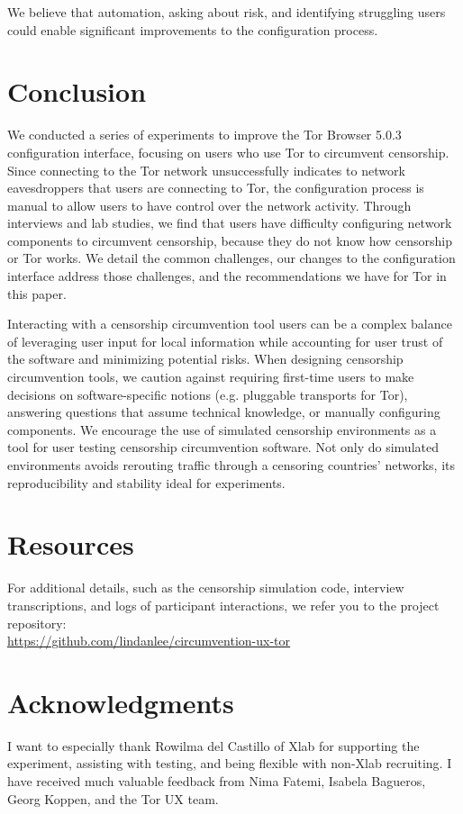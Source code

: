 \documentclass[USenglish,oneside,twocolumn]{article}
\begin{document}
We believe that automation, asking about risk, and identifying struggling users could enable significant improvements to the configuration process. 

\section{Conclusion} 
We conducted a series of experiments to improve the Tor Browser 5.0.3 configuration interface, focusing on users who use Tor to circumvent censorship. Since connecting to the Tor network unsuccessfully indicates to network eavesdroppers that users are connecting to Tor, the configuration process is manual to allow users to have control over the network activity. Through interviews and lab studies, we find that users have difficulty configuring network components to circumvent censorship, because they do not know how censorship or Tor works. We detail the common challenges, our changes to the configuration interface address those challenges, and the recommendations we have for Tor in this paper. 

Interacting with a censorship circumvention tool users can be a complex balance of leveraging user input for local information while accounting for user trust of the software and minimizing potential risks.
When designing censorship circumvention tools, we caution against requiring first-time users to make decisions on software-specific notions (e.g. pluggable transports for Tor), answering questions that assume technical knowledge, or manually configuring components. We encourage the use of simulated censorship environments as a tool for user testing censorship circumvention software. Not only do simulated environments avoids rerouting traffic through a censoring countries' networks, its reproducibility and stability ideal for experiments. 


\section {Resources} 
For additional details, such as the censorship simulation code, interview transcriptions, and logs of participant interactions, we refer you to the project repository: \\

\noindent \url{https://github.com/lindanlee/circumvention-ux-tor}

\section {Acknowledgments}
I want to especially thank Rowilma del Castillo of Xlab for supporting the experiment, assisting with testing, and being flexible with non-Xlab recruiting. I have received much valuable feedback from Nima Fatemi, Isabela Bagueros, Georg Koppen, and the Tor UX team. 
\end{document}

